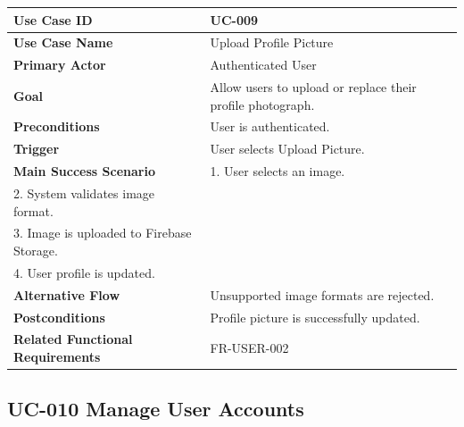 \begin{longtable}{|p{4cm}|p{10cm}|}

\hline
\textbf{Use Case ID} &
UC-009 \\
\hline

\textbf{Use Case Name} &
Upload Profile Picture \\
\hline

\textbf{Primary Actor} &
Authenticated User \\
\hline

\textbf{Goal} &
Allow users to upload or replace their profile photograph. \\
\hline

\textbf{Preconditions} &
User is authenticated. \\
\hline

\textbf{Trigger} &
User selects Upload Picture. \\
\hline

\textbf{Main Success Scenario} &
1. User selects an image.\\
2. System validates image format.\\
3. Image is uploaded to Firebase Storage.\\
4. User profile is updated.\\
\hline

\textbf{Alternative Flow} &
Unsupported image formats are rejected.\\
\hline

\textbf{Postconditions} &
Profile picture is successfully updated.\\
\hline

\textbf{Related Functional Requirements} &
FR-USER-002 \\
\hline

\end{longtable}

\subsection{UC-010 Manage User Accounts}

